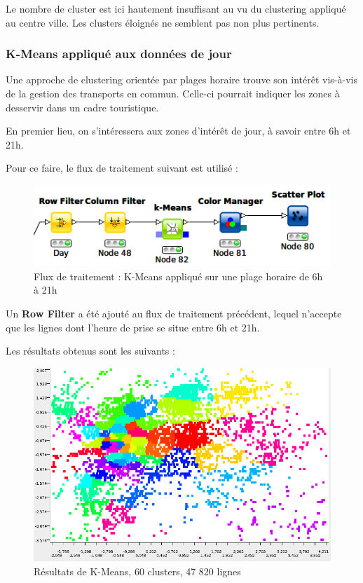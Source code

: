 Le nombre de cluster est ici hautement insuffisant au vu du clustering appliqué au centre ville. Les clusters éloignés ne semblent pas non plus pertinents.



\subsubsection{K-Means appliqué aux données de jour}
Une approche de clustering orientée par plages horaire trouve son intérêt vis-à-vis de la gestion des transports en commun. Celle-ci pourrait indiquer les zones à desservir dans un cadre touristique.

En premier lieu, on s'intéressera aux zones d'intérêt de jour, à savoir entre 6h et 21h.

Pour ce faire, le flux de traitement suivant est utilisé :
\begin{figure}[h!]
    \centering
    \includegraphics[width=\linewidth]{img/knime_k-means_day.png}
    \caption{Flux de traitement : K-Means appliqué sur une plage horaire de 6h à 21h}
\end{figure}

Un \textbf{Row Filter} a été ajouté au flux de traitement précédent, lequel n'accepte que les lignes dont l'heure de prise se situe entre 6h et 21h.

Les résultats obtenus sont les suivants :
\begin{figure}[h!]
    \centering
    \includegraphics[width=\linewidth]{img/60_means_day.png}
    \caption{Résultats de K-Means, 60 clusters, 47 820 lignes}
\end{figure}

